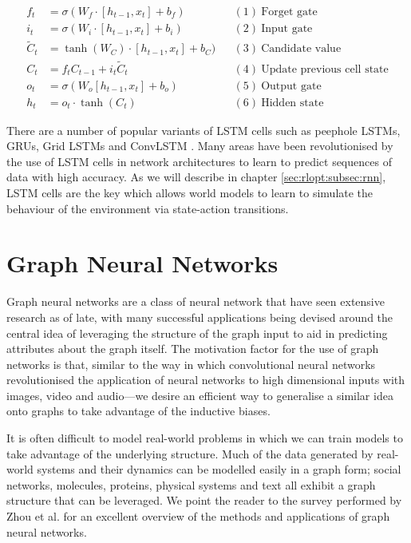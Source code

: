 \begin{center}
  \begin{align*}
    f_t &= \sigma (W_f \cdot [h_{t-1}, x_t] + b_f) && (1)~\text{Forget gate} \\
    i_t &= \sigma (W_i \cdot [h_{t-1}, x_t] + b_i) && (2)~\text{Input gate} \\
    \tilde{C}_t &= \tanh (W_C) \cdot [h_{t-1}, x_t] + b_C) && (3)~\text{Candidate value} \\
    C_t &= f_t C_{t-1} + i_t \tilde{C}_t && (4)~\text{Update previous cell state} \\
    o_t &= \sigma (W_o [h_{t-1}, x_t] + b_o) && (5)~\text{Output gate} \\
    h_t &= o_t \cdot \tanh (C_t) && (6)~\text{Hidden state}
  \end{align*}
\end{center}

There are a number of popular variants of LSTM cells such as peephole LSTMs, GRUs, Grid LSTMs and ConvLSTM \cite{yu2019review}. Many areas have been revolutionised by the use of LSTM cells in network architectures to learn to predict sequences of data with high accuracy. As we will describe in chapter \ref{sec:rlopt:subsec:rnn}, LSTM cells are the key which allows world models to learn to simulate the behaviour of the environment via state-action transitions.

\section{Graph Neural Networks}

Graph neural networks are a class of neural network that have seen extensive research as of late, with many successful applications being devised around the central idea of leveraging the structure of the graph input to aid in predicting attributes about the graph itself. The motivation factor for the use of graph networks is that, similar to the way in which convolutional neural networks revolutionised the application of neural networks to high dimensional inputs with images, video and audio---we desire an efficient way to generalise a similar idea onto graphs to take advantage of the inductive biases.

It is often difficult to model real-world problems in which we can train models to take advantage of the underlying structure. Much of the data generated by real-world systems and their dynamics can be modelled easily in a graph form; social networks, molecules, proteins, physical systems and text all exhibit a graph structure that can be leveraged. We point the reader to the survey performed by Zhou et al. \cite{zhou2020graph} for an excellent overview of the methods and applications of graph neural networks.

